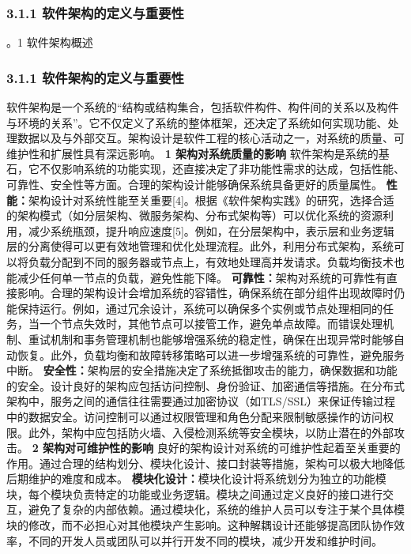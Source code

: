 \subsubsection{3.1.1 软件架构的定义与重要性}\label{ux8f6fux4ef6ux67b6ux6784ux7684ux5b9aux4e49ux4e0eux91cdux8981ux6027} 。1 软件架构概述
\subsubsection{3.1.1 软件架构的定义与重要性}\label{ux8f6fux4ef6ux67b6ux6784ux7684ux5b9aux4e49ux4e0eux91cdux8981ux6027-1}
软件架构是一个系统的``结构或结构集合，包括软件构件、构件间的关系以及构件与环境的关系''。它不仅定义了系统的整体框架，还决定了系统如何实现功能、处理数据以及与外部交互。架构设计是软件工程的核心活动之一，对系统的质量、可维护性和扩展性具有深远影响。
\textbf{1 架构对系统质量的影响} 软件架构是系统的基石，它不仅影响系统的功能实现，还直接决定了非功能性需求的达成，包括性能、可靠性、安全性等方面。合理的架构设计能够确保系统具备更好的质量属性。
\textbf{性能：}架构设计对系统性能至关重要{[}4{]}。根据《软件架构实践》的研究，选择合适的架构模式（如分层架构、微服务架构、分布式架构等）可以优化系统的资源利用，减少系统瓶颈，提升响应速度{[}5{]}。例如，在分层架构中，表示层和业务逻辑层的分离使得可以更有效地管理和优化处理流程。此外，利用分布式架构，系统可以将负载分配到不同的服务器或节点上，有效地处理高并发请求。负载均衡技术也能减少任何单一节点的负载，避免性能下降。
\textbf{可靠性：}架构对系统的可靠性有直接影响。合理的架构设计会增加系统的容错性，确保系统在部分组件出现故障时仍能保持运行。例如，通过冗余设计，系统可以确保多个实例或节点处理相同的任务，当一个节点失效时，其他节点可以接管工作，避免单点故障。而错误处理机制、重试机制和事务管理机制也能够增强系统的稳定性，确保在出现异常时能够自动恢复。此外，负载均衡和故障转移策略可以进一步增强系统的可靠性，避免服务中断。
\textbf{安全性：}架构层的安全措施决定了系统抵御攻击的能力，确保数据和功能的安全。设计良好的架构应包括访问控制、身份验证、加密通信等措施。在分布式架构中，服务之间的通信往往需要通过加密协议（如TLS/SSL）来保证传输过程中的数据安全。访问控制可以通过权限管理和角色分配来限制敏感操作的访问权限。此外，架构中应包括防火墙、入侵检测系统等安全模块，以防止潜在的外部攻击。
\textbf{2 架构对可维护性的影响} 良好的架构设计对系统的可维护性起着至关重要的作用。通过合理的结构划分、模块化设计、接口封装等措施，架构可以极大地降低后期维护的难度和成本。
\textbf{模块化设计：}模块化设计将系统划分为独立的功能模块，每个模块负责特定的功能或业务逻辑。模块之间通过定义良好的接口进行交互，避免了复杂的内部依赖。通过模块化，系统的维护人员可以专注于某个具体模块的修改，而不必担心对其他模块产生影响。这种解耦设计还能够提高团队协作效率，不同的开发人员或团队可以并行开发不同的模块，减少开发和维护时间。
